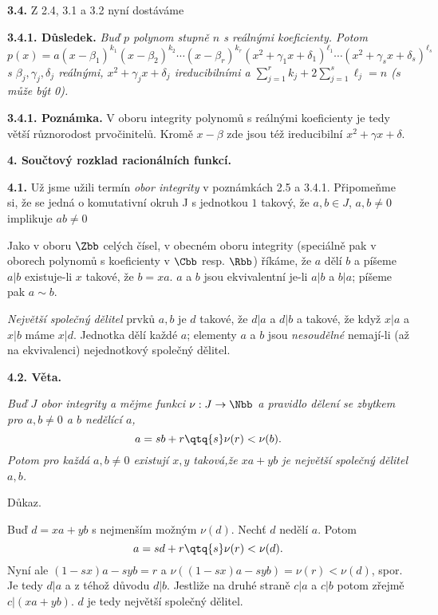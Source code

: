\documentclass[12pt]{article}
\begin{document}
{\bigskip
 
 
 {\bf 3.4.} Z 2.4, 3.1 a 3.2 nyní dostáváme
 
 \medskip
 
 {\bf 3.4.1.  Důsledek.} {\em Buď $p$ polynom stupně $n$ s reálnými koeficienty. Potom
 $$
 p(x)=a(x-\beta_1)^{k_1}(x-\beta_2)^{k_2}\cdots(x-\beta_r)^{k_r}(x^2+\gamma_1 x+\delta_1)^{\ell_1}\cdots
 (x^2+\gamma_s x+\delta_s)^{\ell_s}
 $$
s $\beta_j,\gamma_j,\delta_j$ reálnými, $x^2+\gamma_j x+\delta_j$ ireducibilními a $\sum_{j=1}^rk_j+2\sum_{j=1}^s\ell_j=n$
 ($s$ může být 0).}
 
 \medskip
 
 {\bf 3.4.1. Poznámka.} V oboru integrity polynomů s reálnými koeficienty je tedy větší různorodost prvočinitelů. Kromě  $x-\beta$ zde jsou též ireducibilní $x^2+\gamma x+\delta$.
 
 
 \vskip10mm
 
 {\large\bf 4. Součtový rozklad racionálních funkcí.}
 
 
 
 \bigskip
 
 {\bf 4.1.} Už jsme užili termín  {\em obor integrity} v poznámkách 2.5 a 3.4.1. Připomeňme si, že se jedná o  komutativní okruh  J s jednotkou $1$ takový, že $a,b\in J$, $a,b\neq 0$ implikuje $ab\neq 0$
 
 Jako v oboru $\Zbb$  celých čísel, v obecném oboru integrity (speciálně pak v oborech polynomů
 s koeficienty v $\Cbb$ resp. $\Rbb$) říkáme, že $a$ dělí $b$ a píšeme $a|b$ existuje-li $x$ takové, že $b=xa$. $a$ a $b$ jsou ekvivalentní je-li $a|b$ a $b|a$; píšeme pak $a\sim b$. 
 
  {\em Největší společný dělitel} prvků $a,b$ je $d$ takové, že $d|a$ a $d|b$ a takové, že když $x|a$ a $x|b$ máme $x|d$. Jednotka dělí každé $a$; elementy $a$ a $b$  jsou {\em nesoudělné} nemají-li (až na ekvivalenci) nejednotkový společný dělitel.
 
 \bigskip
 
 {\bf 4.2. Věta.} {\em Buď $J$ obor integrity a mějme funkci $\nu:J\to\Nbb$ a pravidlo dělení se zbytkem
  pro $a,b\neq 0$ a $b$  nedělící $a$,
  $$
  a=sb+r \qtq{s} \nu(r)<\nu(b).
  $$
 Potom pro každá $a,b\neq 0$ existují $x,y$ taková,že $xa+yb$ je největší společný dělitel $a,b$.
 
 Důkaz.} Buď $d=xa+yb$ s nejmenším možným $\nu(d)$. Nechť $d$ nedělí $a$. Potom
 $$
 a=sd+r \qtq{s}  \nu(r)<\nu(d).
 $$
 Nyní ale $(1-sx)a- syb=r$ a $\nu((1-sx)a- syb)=\nu(r)<\nu(d)$, spor. Je tedy $d|a$ a z téhož důvodu $d|b$. Jestliže na druhé straně $c|a$ a $c|b$ potom zřejmě $c|(xa+yb)$. $d$ je tedy největší společný dělitel. \sq
 
}
\end{document}

